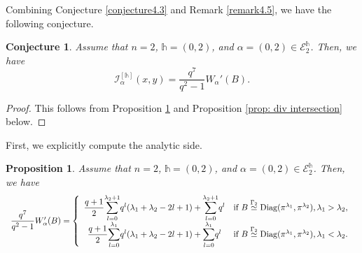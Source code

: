 \documentclass[11pt,oneside]{amsart}
\theoremstyle{plain}
\newtheorem{proposition}[theorem]{Proposition}
\newtheorem{conjecture}[theorem]{Conjecture}
\theoremstyle{definition}
\theoremstyle{remark}
\newcommand{\tx}[1]{\text{#1}}
\newcommand{\CE}{{\mathcal E}}
\newcommand{\CI}{{\mathcal I}}
\newcommand{\diag}{\mathrm{Diag}}
\numberwithin{equation}{section}
\begin{document}
     
     Combining Conjecture \ref{conjecture4.3} and Remark \ref{remark4.5}, we have the following conjecture.
	\begin{conjecture}\label{conjecture4.12}
		Assume that $n=2$, $\mathds{h}=(0,2)$, and $\alpha=(0,2) \in \CE_{2}^{\mathds{h}}$. Then, we have
		\begin{equation*}
			\CI_{\alpha}^{[\mathds{h}]}(x,y)=\dfrac{q^7}{q^2-1} W_{\alpha}'(B).
		\end{equation*}
	\end{conjecture}
    \begin{proof}
        This follows from Proposition \ref{proposition4.13} and Proposition \ref{prop: div intersection} below.
    \end{proof}
    First, we explicitly compute the analytic side.
	\begin{proposition}\label{proposition4.13}
		Assume that $n=2$, $\mathds{h}=(0,2)$, and $\alpha=(0,2) \in \CE_{2}^{\mathds{h}}$. Then, we have
		\begin{equation*}\begin{array}{l}
				\dfrac{q^7}{q^2-1} W_{\alpha}'(B)
				=\left\lbrace \begin{array}{cc}
					\dfrac{q+1}{2}\mathlarger{\sum}_{l=0}^{\lambda_2+1} q^l(\lambda_1+\lambda_2-2l+1)+\mathlarger{\sum}_{l=0}^{\lambda_2+1}q^l & \tx{if }B \overset{\Gamma_2}{\simeq} \diag(\pi^{\lambda_1},\pi^{\lambda_2}), \lambda_1 >\lambda_2,\\
					\dfrac{q+1}{2}\mathlarger{\sum}_{l=0}^{\lambda_1} q^l(\lambda_1+\lambda_2-2l+1)+\mathlarger{\sum}_{l=0}^{\lambda_1}q^l & \tx{if }B \overset{\Gamma_2}{\simeq} \diag(\pi^{\lambda_1},\pi^{\lambda_2}), \lambda_1 <\lambda_2.
				\end{array}\right.
			\end{array}
		\end{equation*}
	\end{proposition}
\end{document}
